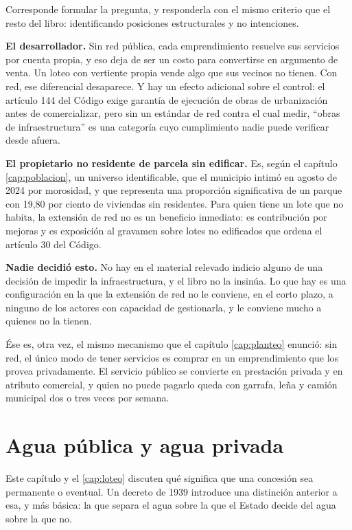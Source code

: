 \begin{cautela}
Corresponde formular la pregunta, y responderla con el mismo criterio que el resto del libro: identificando posiciones estructurales y no intenciones.

\textbf{El desarrollador.} Sin red pública, cada emprendimiento resuelve sus servicios por cuenta propia, y eso deja de ser un costo para convertirse en argumento de venta. Un loteo con vertiente propia vende algo que sus vecinos no tienen. Con red, ese diferencial desaparece. Y hay un efecto adicional sobre el control: el artículo 144 del Código exige garantía de ejecución de obras de urbanización antes de comercializar, pero sin un estándar de red contra el cual medir, ``obras de infraestructura'' es una categoría cuyo cumplimiento nadie puede verificar desde afuera.

\textbf{El propietario no residente de parcela sin edificar.} Es, según el capítulo \ref{cap:poblacion}, un universo identificable, que el municipio intimó en agosto de 2024 por morosidad, y que representa una proporción significativa de un parque con 19,80 por ciento de viviendas sin residentes. Para quien tiene un lote que no habita, la extensión de red no es un beneficio inmediato: es contribución por mejoras y es exposición al gravamen sobre lotes no edificados que ordena el artículo 30 del Código.

\textbf{Nadie decidió esto.} No hay en el material relevado indicio alguno de una decisión de impedir la infraestructura, y el libro no la insinúa. Lo que hay es una configuración en la que la extensión de red no le conviene, en el corto plazo, a ninguno de los actores con capacidad de gestionarla, y le conviene mucho a quienes no la tienen.

Ése es, otra vez, el mismo mecanismo que el capítulo \ref{cap:planteo} enunció: sin red, el único modo de tener servicios es comprar en un emprendimiento que los provea privadamente. El servicio público se convierte en prestación privada y en atributo comercial, y quien no puede pagarlo queda con garrafa, leña y camión municipal dos o tres veces por semana.
\end{cautela}

\section{Agua pública y agua privada}

Este capítulo y el \ref{cap:loteo} discuten qué significa que una concesión sea permanente o eventual. Un
decreto de 1939 introduce una distinción anterior a esa, y más básica: la que separa el agua
sobre la que el Estado decide del agua sobre la que no.

